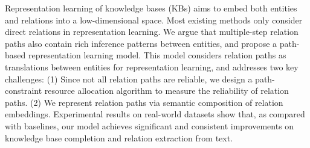 Representation learning of knowledge bases (KBs) aims to embed both entities and relations into a low-dimensional space. Most existing methods only consider direct relations in representation learning. We argue that multiple-step relation paths also contain rich inference patterns between entities, and propose a path-based representation learning model. This model considers relation paths as translations between entities for representation learning, and addresses two key challenges: (1) Since not all relation paths are reliable, we design a path-constraint resource allocation algorithm to measure the reliability of relation paths. (2) We represent relation paths via semantic composition of relation embeddings. Experimental results on real-world datasets show that, as compared with baselines, our model achieves significant and consistent improvements on knowledge base completion and relation extraction from text.
